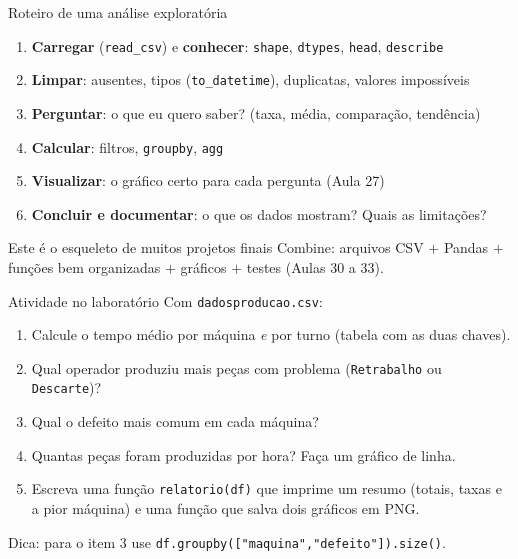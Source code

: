 \documentclass[aspectratio=169,10pt,t]{beamer}
\begin{document}
\begin{frame}{Roteiro de uma análise exploratória}
  \begin{enumerate}
    \item \textbf{Carregar} (\texttt{read\_csv}) e \textbf{conhecer}: \texttt{shape}, \texttt{dtypes}, \texttt{head}, \texttt{describe}
    \item \textbf{Limpar}: ausentes, tipos (\texttt{to\_datetime}), duplicatas, valores impossíveis
    \item \textbf{Perguntar}: o que eu quero saber? (taxa, média, comparação, tendência)
    \item \textbf{Calcular}: filtros, \texttt{groupby}, \texttt{agg}
    \item \textbf{Visualizar}: o gráfico certo para cada pergunta (Aula 27)
    \item \textbf{Concluir e documentar}: o que os dados mostram? Quais as limitações?
  \end{enumerate}
  \begin{exampleblock}{Este é o esqueleto de muitos projetos finais}
    Combine: arquivos CSV \(+\) Pandas \(+\) funções bem organizadas \(+\) gráficos \(+\) testes (Aulas 30 a 33).
  \end{exampleblock}
\end{frame}

\begin{frame}{Atividade no laboratório}
  Com \texttt{dadosproducao.csv}:
  \begin{enumerate}
    \item Calcule o tempo médio por máquina \emph{e} por turno (tabela com as duas chaves).
    \item Qual operador produziu mais peças com problema (\texttt{Retrabalho} ou \texttt{Descarte})?
    \item Qual o defeito mais comum em cada máquina?
    \item Quantas peças foram produzidas por hora? Faça um gráfico de linha.
    \item Escreva uma função \texttt{relatorio(df)} que imprime um resumo (totais, taxas e a pior máquina) e uma função que salva dois gráficos em PNG.
  \end{enumerate}
  \footnotesize Dica: para o item 3 use \texttt{df.groupby(["maquina","defeito"]).size()}.
\end{frame}

\end{document}
